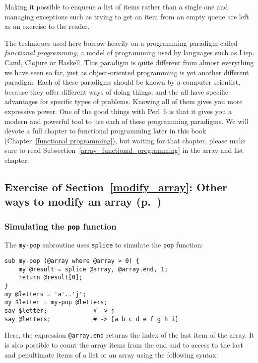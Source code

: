 {Making it possible to enqueue a list of items rather 
than a single one and managing 
exceptions such as trying to get an item from an empty queue 
are left as an exercise to the reader.

The techniques used here borrow heavily on a programming 
paradigm called \emph{functional programming}, a model of 
programming used by languages such as Lisp, Caml, Clojure or 
Haskell. This paradigm is quite different from almost 
everything we have seen so far, just as object-oriented 
programming is yet another different paradigm. Each of these 
paradigms should be known by a computer scientist, because they offer different ways of doing things, and the all have specific 
advantages for specific types of problems. Knowing all of them 
gives you more expressive power. One of the good things with 
Perl~6 is that it gives you a modern and powerful tool to use 
each of these programming paradigms. We will devote a full 
chapter to functional programming later in this book 
(Chapter~\ref{functional programming}), but waiting for that 
chapter, please make sure to read 
Subsection~\ref{array_functional_programming} in the 
array and list chapter.

\subsection{Exercise of Section~\ref{modify_array}: Other ways to modify an array (p.~\pageref{splice_exercise})}
\label{sol_splice_exercise}

\subsubsection{Simulating the {\tt pop} function}

The {\tt my-pop} subroutine uses {\tt splice} to simulate 
the {\tt pop} function:  

\begin{verbatim}
sub my-pop (@array where @array > 0) {
    my @result = splice @array, @array.end, 1;
    return @result[0];
}
my @letters = 'a'..'j';
my $letter = my-pop @letters;
say $letter;             # -> j
say @letters;            # -> [a b c d e f g h i]
\end{verbatim}

Here, the expression \verb'@array.end' returns the index of 
the last item of the array. It is also possible to count 
the array items from the end and to access to the last and 
penultimate items of a list or an array using the following 
syntax:

}
